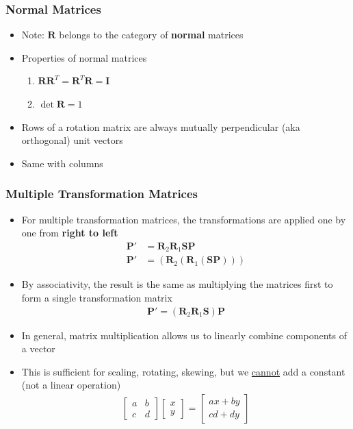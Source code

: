 \documentclass[letterpaper,12pt]{article}
\newcommand{\vect}[1]{\mathbf{#1}}
\newcommand{\matr}[1]{\mathbf{#1}}
\begin{document}
\subsubsection{Normal Matrices}
\begin{itemize}
 \item Note: $\matr{R}$ belongs to the category of \textbf{normal} matrices
 \item Properties of normal matrices
       \begin{enumerate}
        \item $\matr{R} \matr{R}^T = \matr{R}^T \matr{R} = \matr{I}$
        \item $\det{\matr{R}} = 1$
       \end{enumerate}
 \item Rows of a rotation matrix are always mutually perpendicular (aka orthogonal) unit vectors
 \item Same with columns
\end{itemize}

\subsubsection{Multiple Transformation Matrices}
\begin{itemize}
 \item For multiple transformation matrices, the transformations are applied one by one from \textbf{right to left}
       \begin{align}
        \vect{P}' & = \matr{R}_2\matr{R}_1\matr{S}\vect{P}       \\
        \vect{P}' & = (\matr{R}_2(\matr{R}_1(\matr{S}\vect{P})))
       \end{align}
 \item By associativity, the result is the same as multiplying the matrices first to form a single transformation matrix
       \begin{align}
        \vect{P}' = (\matr{R}_2\matr{R}_1\matr{S})\vect{P}
       \end{align}
\end{itemize}

\begin{itemize}
 \item In general, matrix multiplication allows us to linearly combine components of a vector
 \item This is sufficient for scaling, rotating, skewing, but we \underline{cannot} add a constant (not a linear operation)
       \begin{align}
        \begin{bmatrix}
         a & b \\
         c & d
        \end{bmatrix}
        \begin{bmatrix}
         x \\
         y
        \end{bmatrix}
        = \begin{bmatrix}
         ax + by \\
         cd + dy
        \end{bmatrix}
       \end{align}
\end{itemize}
\end{document}
